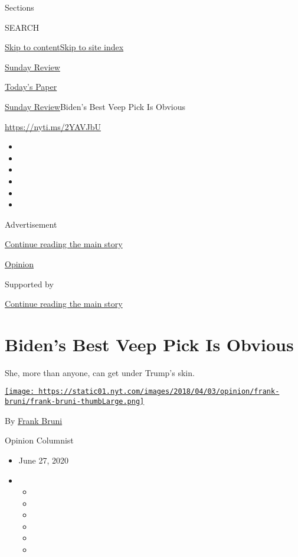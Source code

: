 Sections

SEARCH

\protect\hyperlink{site-content}{Skip to
content}\protect\hyperlink{site-index}{Skip to site index}

\href{https://www.nytimes.com/section/opinion/sunday}{Sunday Review}

\href{https://myaccount.nytimes.com/auth/login?response_type=cookie\&client_id=vi}{}

\href{https://www.nytimes.com/section/todayspaper}{Today's Paper}

\href{/section/opinion/sunday}{Sunday Review}\textbar{}Biden's Best Veep
Pick Is Obvious

\href{https://nyti.ms/2YAVJbU}{https://nyti.ms/2YAVJbU}

\begin{itemize}
\item
\item
\item
\item
\item
\item
\end{itemize}

Advertisement

\protect\hyperlink{after-top}{Continue reading the main story}

\href{/section/opinion}{Opinion}

Supported by

\protect\hyperlink{after-sponsor}{Continue reading the main story}

\hypertarget{bidens-best-veep-pick-is-obvious}{%
\section{Biden's Best Veep Pick Is
Obvious}\label{bidens-best-veep-pick-is-obvious}}

She, more than anyone, can get under Trump's skin.

\href{https://www.nytimes.com/by/frank-bruni}{\texttt{[image: https://static01.nyt.com/images/2018/04/03/opinion/frank-bruni/frank-bruni-thumbLarge.png]}}

By \href{https://www.nytimes.com/by/frank-bruni}{Frank Bruni}

Opinion Columnist

\begin{itemize}
\item
  June 27, 2020
\item
  \begin{itemize}
  \item
  \item
  \item
  \item
  \item
  \item
  \end{itemize}
\end{itemize}

